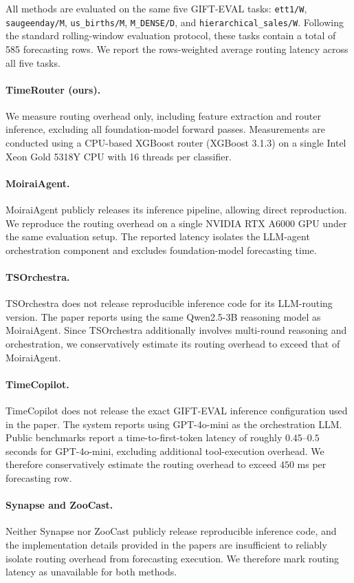 \documentclass{article}
\theoremstyle{plain}
\theoremstyle{definition}
\theoremstyle{remark}
\begin{document}
All methods are evaluated on the same five GIFT-EVAL tasks: \texttt{ett1/W}, \texttt{saugeenday/M}, \texttt{us\_births/M}, \texttt{M\_DENSE/D}, and \texttt{hierarchical\_sales/W}. Following the standard rolling-window evaluation protocol, these tasks contain a total of 585 forecasting rows. We report the rows-weighted average routing latency across all five tasks.

\paragraph{TimeRouter (ours).}
We measure routing overhead only, including feature extraction and router inference, excluding all foundation-model forward passes. Measurements are conducted using a CPU-based XGBoost router (XGBoost 3.1.3) on a single Intel Xeon Gold 5318Y CPU with 16 threads per classifier.

\paragraph{MoiraiAgent.}
MoiraiAgent publicly releases its inference pipeline, allowing direct reproduction. We reproduce the routing overhead on a single NVIDIA RTX A6000 GPU under the same evaluation setup. The reported latency isolates the LLM-agent orchestration component and excludes foundation-model forecasting time.

\paragraph{TSOrchestra.}
TSOrchestra does not release reproducible inference code for its LLM-routing version. The paper reports using the same Qwen2.5-3B reasoning model as MoiraiAgent. Since TSOrchestra additionally involves multi-round reasoning and orchestration, we conservatively estimate its routing overhead to exceed that of MoiraiAgent.

\paragraph{TimeCopilot.}
TimeCopilot does not release the exact GIFT-EVAL inference configuration used in the paper. The system reports using GPT-4o-mini as the orchestration LLM. Public benchmarks report a time-to-first-token latency of roughly $0.45$--$0.5$ seconds for GPT-4o-mini, excluding additional tool-execution overhead. We therefore conservatively estimate the routing overhead to exceed $450$ ms per forecasting row.

\paragraph{Synapse and ZooCast.}
Neither Synapse nor ZooCast publicly release reproducible inference code, and the implementation details provided in the papers are insufficient to reliably isolate routing overhead from forecasting execution. We therefore mark routing latency as unavailable for both methods.
\end{document}
